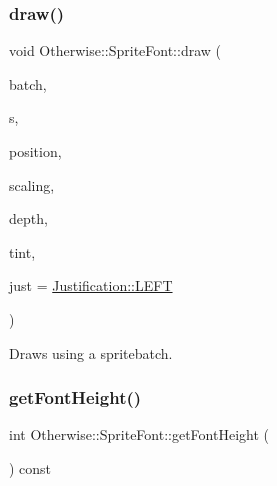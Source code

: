 \subsubsection{\texorpdfstring{draw()}{draw()}}
{\footnotesize\ttfamily void Otherwise\+::\+Sprite\+Font\+::draw (\begin{DoxyParamCaption}\item[{\hyperlink{class_otherwise_1_1_sprite_batch}{Sprite\+Batch} \&}]{batch,  }\item[{const char $\ast$}]{s,  }\item[{glm\+::vec2}]{position,  }\item[{glm\+::vec2}]{scaling,  }\item[{float}]{depth,  }\item[{\hyperlink{struct_otherwise_1_1_color_r_g_b_a8}{Color\+R\+G\+B\+A8}}]{tint,  }\item[{\hyperlink{namespace_otherwise_a9eef3c22cbba8efff0211f92a1ed2792}{Justification}}]{just = {\ttfamily \hyperlink{namespace_otherwise_a9eef3c22cbba8efff0211f92a1ed2792a684d325a7303f52e64011467ff5c5758}{Justification\+::\+L\+E\+FT}} }\end{DoxyParamCaption})}



Draws using a spritebatch. 

\mbox{\label{class_otherwise_1_1_sprite_font_ae6a8a5b1525ec7563fe5a89e91de5707}} 
\subsubsection{\texorpdfstring{get\+Font\+Height()}{getFontHeight()}}
{\footnotesize\ttfamily int Otherwise\+::\+Sprite\+Font\+::get\+Font\+Height (\begin{DoxyParamCaption}{ }\end{DoxyParamCaption}) const\hspace{0.3cm}{\ttfamily [inline]}}

\mbox{\label{class_otherwise_1_1_sprite_font_a26716712928e6dfab852320a2d6d29e8}} 
